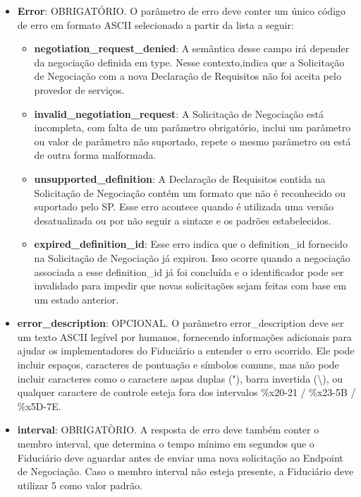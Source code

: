 \begin{itemize}

    \item \textbf{Error}: OBRIGATÓRIO. O parâmetro de erro deve conter um único código de erro em formato ASCII selecionado a partir da lista a seguir:

    \begin{itemize}
    
        \item \textbf{negotiation\_request\_denied}: A semântica desse campo irá depender da negociação definida em type. Nesse contexto,indica que a Solicitação de Negociação com a nova Declaração de Requisitos não foi aceita pelo provedor de serviços.

        \item \textbf{invalid\_negotiation\_request}: A Solicitação de Negociação está incompleta, com falta de um parâmetro obrigatório, inclui um parâmetro ou valor de parâmetro não suportado, repete o mesmo parâmetro ou está de outra forma malformada.

        \item \textbf{unsupported\_definition}: A Declaração de Requisitos contida na Solicitação de Negociação contém um formato que não é reconhecido ou suportado pelo \acs{SP}. Esse erro acontece quando é utilizada uma versão desatualizada ou por não seguir a sintaxe e os padrões estabelecidos.

        \item \textbf{expired\_definition\_id}: Esse erro indica que o definition\_id fornecido na Solicitação de Negociação já expirou. Isso ocorre quando a negociação associada a esse definition\_id já foi concluída e o identificador pode ser invalidado para impedir que novas solicitações sejam feitas com base em um estado anterior.
        
    \end{itemize}

    \item \textbf{error\_description}: OPCIONAL. O parâmetro error\_description deve ser um texto ASCII legível por humanos, fornecendo informações adicionais para ajudar os implementadores do Fiduciário a entender o erro ocorrido. Ele pode incluir espaços, caracteres de pontuação e símbolos comuns, mas não pode incluir caracteres como o caractere aspas duplas ("), barra invertida (\textbackslash), ou qualquer caractere de controle esteja fora dos intervalos \%x20-21 / \%x23-5B / \%x5D-7E.

    \item \textbf{interval}: OBRIGATÒRIO. A resposta de erro deve também conter o membro interval, que determina o tempo mínimo em segundos que o Fiduciário deve aguardar antes de enviar uma nova solicitação ao Endpoint de Negociação. Caso o membro interval não esteja presente, a Fiduciário deve utilizar 5 como valor padrão.
    
\end{itemize}


